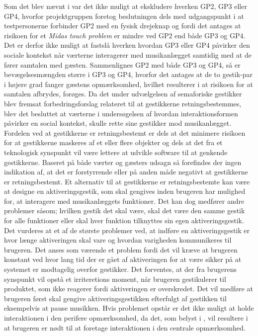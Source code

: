 Som det blev nævnt i  var det ikke muligt at ekskludere hverken GP2, GP3 eller GP4, hvorfor projektgruppen foretog beslutningen dels med udgangspunkt i at testpersonerne forbinder GP2 med en fysisk drejeknap og fordi det antages at risikoen for et \textit{Midas touch problem} er mindre ved GP2 end både GP3 og GP4. Det er derfor ikke muligt at fastslå hverken hvordan GP3 eller GP4 påvirker den sociale kontekst når værterne interagerer med musikanlægget samtidig med at de fører samtalen med gæsten. Sammenlignes GP2 med både GP3 og GP4, så er bevægelsesmængden større i GP3 og GP4, hvorfor det antages at de to gestik-par i højere grad fanger gæstens opmærksomhed, hvilket resulterer i at risikoen for at samtalen afbrydes, forøges.\blankline
%
Da det under udvælgelsen af semaforiske gestikker blev fremsat forbedringsforslag relateret til at gestikkerne retningsbestemmes, blev det besluttet at værterne i undersøgelsen af hvordan interaktionsformen påvirker en social kontekst, skulle rette sine gestikker mod musikanlægget. Fordelen ved at gestikkerne er retningsbestemt er dels at det minimere risikoen for at gestikkerne maskeres af et eller flere objekter og dels at det fra et teknologisk synspunkt vil være lettere at udvikle software til at genkende gestikkerne. Baseret på både værter og gæsters udsagn så forefindes der ingen indikation af, at det er forstyrrende eller på anden måde negativt at gestikkerne er retningsbestemt. Et alternativ til at gestikkerne er retningsbestemte kan være at designe en aktiveringsgestik, som skal gengives inden brugeren har mulighed for, at interagere med musikanlæggets funktioner. Det kan dog medfører andre problemer såsom; hvilken gestik det skal være, skal det være den samme gestik for alle funktioner eller skal hver funktion tilknyttes sin egen aktiveringsgestik. Det vurderes at et af de største problemer ved, at indføre en aktiveringsgestik er hvor længe aktiveringen skal vare og hvordan varigheden kommunikeres til brugeren. Det anses som værende et problem fordi det vil kræve at brugeren konstant ved hvor lang tid der er gået af aktiveringen for at være sikker på at systemet er modtagelig overfor gestikker. Det forventes, at der fra brugerens synspunkt vil opstå et irriteretions moment, når brugeren gestikulerer til produktet, som ikke reagerer fordi aktiveringen er overskredet. Det vil medføre at brugeren først skal gengive aktiveringsgestikken efterfulgt af gestikken til eksempelvis at pause musikken. Hvis problemet opstår er det ikke muligt at holde interaktionen i den perifere opmærksomhed, da det, som belyst i , vil resultere i at brugeren er nødt til at foretage interaktionen i den centrale opmærksomhed. 


